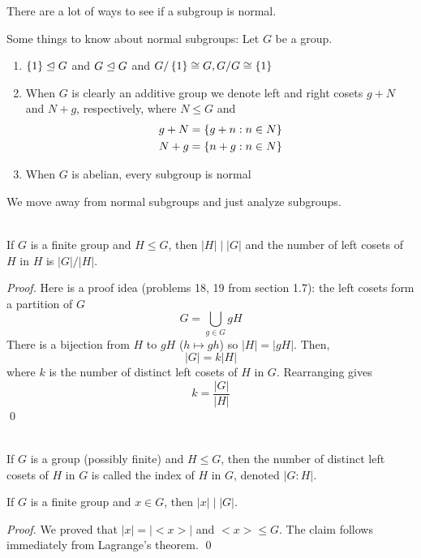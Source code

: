 There are a lot of ways to see if a subgroup is normal.

Some things to know about normal subgroups: Let $G$ be a group.
\begin{enumerate}
    \item $\left\{1\right\} \trianglelefteq G$ and $G \trianglelefteq G$ and $G/\left\{1\right\} \cong G, G/G \cong \left\{1\right\}$
    \item When $G$ is clearly an additive group we denote left and right cosets $g + N$ and $N+g$, respectively, where $N\leq G$ and 
    \begin{align*}
        g+N &= \left\{g+n : n \in N\right\} \\
        N+g &= \left\{n+g : n \in N\right\}
    \end{align*}
    \item When $G$ is abelian, every subgroup is normal
\end{enumerate}

We move away from normal subgroups and just analyze subgroups.

\begin{theorem} \leavevmode \\
    \label{thm8}
    If $G$ is a finite group and $H \leq G$, then $|H| \mid |G|$ and the number of left cosets of $H$ in $H$ is $|G| / |H|$.
\end{theorem}

\begin{proof}
    Here is a proof idea (problems 18, 19 from section 1.7): the left cosets form a partition of $G$
    $$G = \bigcup \limits_{g \in G}gH$$
    There is a bijection from $H$ to $gH$ ($h \mapsto gh$) so $|H| = |gH|$. Then,
    $$|G|=k|H|$$
    where $k$ is the number of distinct left cosets of $H$ in $G$. Rearranging gives 
    $$k = \frac{|G|}{|H|}$$
    \qed
\end{proof}

\begin{definition} \leavevmode \\
    If $G$ is a group (possibly finite) and $H \leq G$, then the number of distinct left cosets of $H$ in $G$ is called the index of $H$ in $G$, denoted $|G : H|$.
\end{definition}

\begin{corollary}
    \label{cor9}
    If $G$ is a finite group and $x \in G$, then $|x| \mid |G|$.
\end{corollary}

\begin{proof}
    We proved that $|x| = |<x>|$ and $<x> \leq G$. The claim follows immediately from Lagrange's theorem.
    \qed
\end{proof}

